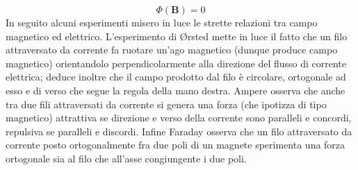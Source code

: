 \documentclass[
10pt, %
a4paper, %
oneside, %
headinclude,footinclude, %
BCOR5mm, %
]{scrartcl}
\begin{document}
\[\Phi(\mathbf{B}) = 0\] 
In seguito alcuni esperimenti misero in luce le strette relazioni tra campo magnetico ed elettrico. L'esperimento di \O{}rsted mette in luce il fatto che un filo attraversato da corrente fa ruotare un'ago magnetico (dunque produce campo magnetico) orientandolo perpendicolarmente alla direzione del flusso di corrente elettrica; deduce inoltre che il campo prodotto dal filo è circolare, ortogonale ad esso e di verso che segue la regola della mano destra. Ampere osserva che anche tra due fili attraversati da corrente si genera una forza (che ipotizza di tipo magnetico) attrattiva se direzione e verso della corrente sono paralleli e concordi, repulsiva se paralleli e discordi. Infine Faraday osserva che un filo attraversato da corrente posto ortogonalmente fra due poli di un magnete sperimenta una forza ortogonale sia al filo che all'asse congiungente i due poli.\\
\end{document}
